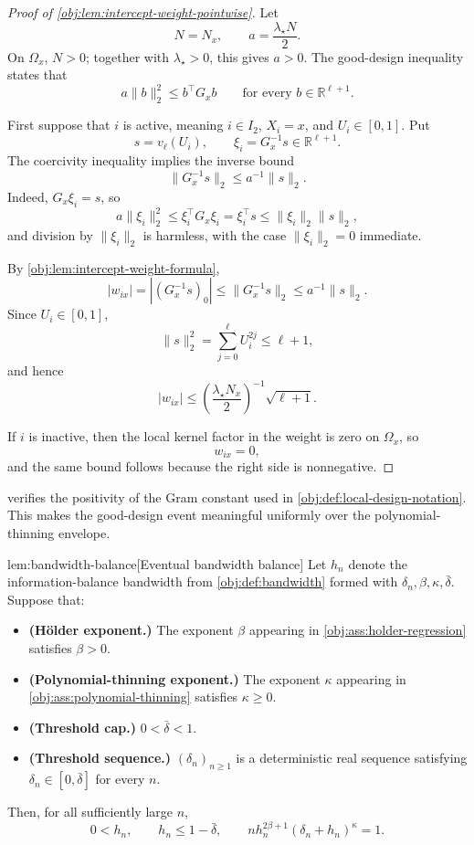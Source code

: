 \documentclass[11pt]{article}
\begin{document}
\begin{proof}[Proof of \cref{obj:lem:intercept-weight-pointwise}]
Let
\[
N=N_x,\qquad
a=\frac{\lambda_\star N}{2}.
\]
On \(\Omega_x\), \(N>0\); together with \(\lambda_\star>0\), this gives \(a>0\).  The good-design inequality states that
\[
a\|b\|_2^2\le b^\top G_xb
\qquad\text{for every }b\in\mathbb R^{\ell+1}.
\]

First suppose that \(i\) is active, meaning \(i\in I_2\), \(X_i=x\), and \(U_i\in[0,1]\).  Put
\[
s=v_\ell(U_i),\qquad \xi_i=G_x^{-1}s\in\mathbb R^{\ell+1}.
\]
The coercivity inequality implies the inverse bound
\[
\|G_x^{-1}s\|_2\le a^{-1}\|s\|_2 .
\]
Indeed, \(G_x\xi_i=s\), so
\[
a\|\xi_i\|_2^2\le \xi_i^\top G_x\xi_i=\xi_i^\top s\le \|\xi_i\|_2\|s\|_2,
\]
and division by \(\|\xi_i\|_2\) is harmless, with the case \(\|\xi_i\|_2=0\) immediate. %

By \cref{obj:lem:intercept-weight-formula},
\[
|w_{ix}|
=
\left|(G_x^{-1}s)_0\right|
\le
\|G_x^{-1}s\|_2
\le
a^{-1}\|s\|_2 .
\]
Since \(U_i\in[0,1]\),
\[
\|s\|_2^2
=
\sum_{j=0}^{\ell}U_i^{2j}
\le
\ell+1,
\]
and hence
\[
|w_{ix}|
\le
\left(\frac{\lambda_\star N_x}{2}\right)^{-1}\sqrt{\ell+1}.
\]

If \(i\) is inactive, then the local kernel factor in the weight is zero on \(\Omega_x\), so
\[
w_{ix}=0,
\]
and the same bound follows because the right side is nonnegative. %
\end{proof}

 verifies the positivity of the Gram constant used in \cref{obj:def:local-design-notation}. This makes the good-design event meaningful uniformly over the polynomial-thinning envelope.

\begin{lemmav}{lem:bandwidth-balance}[Eventual bandwidth balance]
Let \(h_n\) denote the information-balance bandwidth from \cref{obj:def:bandwidth} formed with \(\delta_n,\beta,\kappa,\bar\delta\). Suppose that:
\begin{itemize}
\item \textbf{(Hölder exponent.)} The exponent \(\beta\) appearing in \cref{obj:ass:holder-regression} satisfies \(\beta>0\).
\item \textbf{(Polynomial-thinning exponent.)} The exponent \(\kappa\) appearing in \cref{obj:ass:polynomial-thinning} satisfies \(\kappa\geq0\).
\item \textbf{(Threshold cap.)} \(0<\bar\delta<1\).
\item \textbf{(Threshold sequence.)} \((\delta_n)_{n\geq1}\) is a deterministic real sequence satisfying \(\delta_n\in[0,\bar\delta]\) for every \(n\).
\end{itemize}
Then, for all sufficiently large \(n\),
\[
0<h_n,\qquad
h_n\leq 1-\bar\delta,\qquad
n h_n^{2\beta+1}(\delta_n+h_n)^\kappa=1.
\]
\end{lemmav}
\end{document}
